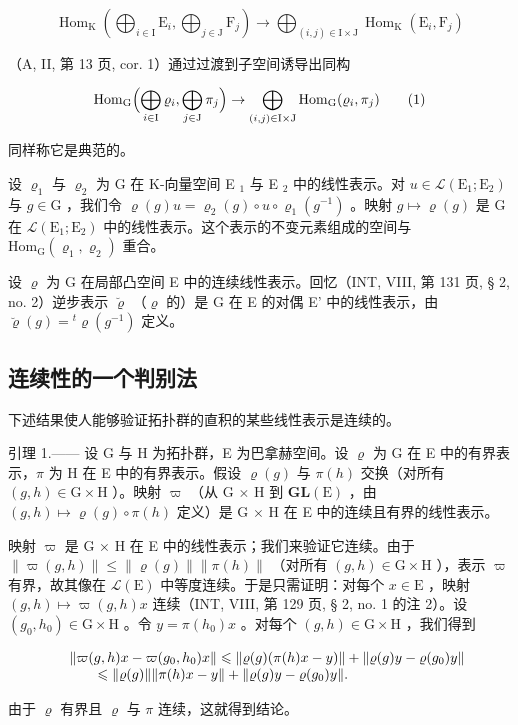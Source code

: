 \[
\operatorname{Hom} _ {\mathrm{K}} \left(\bigoplus_ {i \in \mathrm{I}} \mathrm{E} _ {i}, \bigoplus_ {j \in \mathrm{J}} \mathrm{F} _ {j}\right)\rightarrow \bigoplus_ {(i, j) \in \mathrm{I} \times \mathrm{J}} \operatorname{Hom} _ {\mathrm{K}} (\mathrm{E} _ {i}, \mathrm{F} _ {j})
\]

（A, II, 第 13 页, cor. 1）通过过渡到子空间诱导出同构

\[
\mathrm{Hom} _ {\mathrm{G}} \Bigl (\bigoplus_ {i \in \mathrm{I}} \varrho_ {i}, \bigoplus_ {j \in \mathrm{J}} \pi_ {j} \Bigr) \to \bigoplus_ {(i, j) \in \mathrm{I} \times \mathrm{J}} \mathrm{Hom} _ {\mathrm{G}} (\varrho_ {i}, \pi_ {j})\tag{1}
\]

同样称它是典范的。

设 \(\varrho_{1}\) 与 \(\varrho_{2}\) 为 G 在 K-向量空间 E \(_{1}\) 与 E \(_{2}\) 中的线性表示。对 \(u \in \mathcal{L}(\mathrm{E}_{1};\mathrm{E}_{2})\) 与 \(g \in \mathrm{G}\) ，我们令 \(\varrho(g)u = \varrho_{2}(g) \circ u \circ \varrho_{1}(g^{-1})\) 。映射 \(g \mapsto \varrho(g)\) 是 G 在 \(\mathcal{L}(\mathrm{E}_{1};\mathrm{E}_{2})\) 中的线性表示。这个表示的不变元素组成的空间与 \(\mathrm{Hom}_{\mathrm{G}}(\varrho_{1},\varrho_{2})\) 重合。

设 \(\varrho\) 为 G 在局部凸空间 E 中的连续线性表示。回忆（INT, VIII, 第 131 页, § 2, no. 2）逆步表示 \(\breve{\varrho}\) （\(\varrho\) 的）是 G 在 E 的对偶 E' 中的线性表示，由 \(\breve{\varrho}(g) = {}^{t} \varrho(g^{-1})\) 定义。

\subsection{连续性的一个判别法}

下述结果使人能够验证拓扑群的直积的某些线性表示是连续的。

引理 1.—— 设 G 与 H 为拓扑群，E 为巴拿赫空间。设 \(\varrho\) 为 G 在 E 中的有界表示，\(\pi\) 为 H 在 E 中的有界表示。假设 \(\varrho(g)\) 与 \(\pi(h)\) 交换（对所有 \((g,h)\in\mathrm{G}\times\mathrm{H}\) ）。映射 \(\varpi\) （从 G \(\times\) H 到 \(\mathbf{GL}(\mathrm{E})\) ，由 \((g,h)\mapsto\varrho(g)\circ\pi(h)\) 定义）是 G \(\times\) H 在 E 中的连续且有界的线性表示。

映射 \(\varpi\) 是 G × H 在 E 中的线性表示；我们来验证它连续。由于 \(\| \varpi(g, h) \| \leqslant \| \varrho(g) \| \| \pi(h) \|\) （对所有 \((g, h) \in \mathrm{G} \times \mathrm{H}\) ），表示 \(\varpi\) 有界，故其像在 \(\mathcal{L}(\mathrm{E})\) 中等度连续。于是只需证明：对每个 \(x \in \mathrm{E}\) ，映射 \((g, h) \mapsto \varpi(g, h)x\) 连续（INT, VIII, 第 129 页, § 2, no. 1 的注 2）。设 \((g_0, h_0) \in \mathrm{G} \times \mathrm{H}\) 。令 \(y = \pi(h_0)x\) 。对每个 \((g, h) \in \mathrm{G} \times \mathrm{H}\) ，我们得到

\[
\begin{array}{r l} & {\| \varpi (g, h) x - \varpi (g _ {0}, h _ {0}) x \| \leqslant \| \varrho (g) (\pi (h) x - y) \| + \| \varrho (g) y - \varrho (g _ {0}) y \|} \\ & {\qquad \leqslant \| \varrho (g) \| \| \pi (h) x - y \| + \| \varrho (g) y - \varrho (g _ {0}) y \|.} \end{array}
\]

由于 \(\varrho\) 有界且 \(\varrho\) 与 \(\pi\) 连续，这就得到结论。